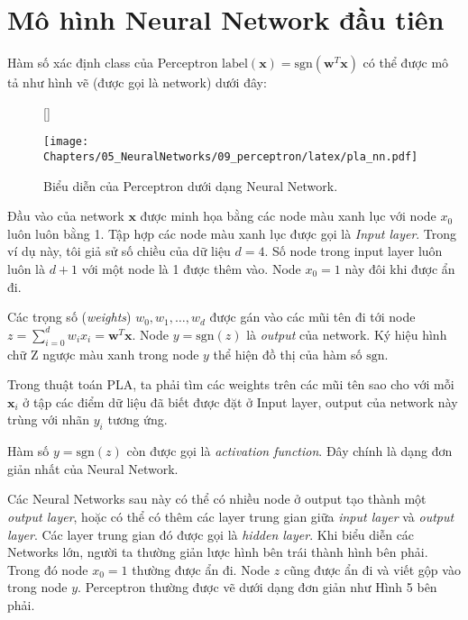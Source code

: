  
\section{Mô hình Neural Network đầu tiên}
Hàm số xác định class của Perceptron $\text{label}(\mathbf{x}) = \text{sgn}(\mathbf{w}^T\mathbf{x})$ có thể được mô tả như hình vẽ (được gọi là network) dưới đây: 
 
\begin{figure}[t]
     [\FBwidth]
     {\caption{ 
     Biểu diễn của Perceptron dưới dạng Neural Network.
     }
     \label{fig:9_5}}
     { %
     \texttt{[image: Chapters/05\_NeuralNetworks/09\_perceptron/latex/pla\_nn.pdf]}
     }
 \end{figure}
  
Đầu vào của network $\mathbf{x}$ được minh họa bằng các node màu xanh lục với node $x_0$ luôn luôn bằng 1. Tập hợp các node màu xanh lục được gọi là \textit{Input layer}. Trong ví dụ này, tôi giả sử số chiều của dữ liệu $d = 4$. Số node trong input layer luôn luôn là $d + 1$ với một node là 1 được thêm vào. Node $x_0 = 1$ này đôi khi được ẩn đi.  
 
Các trọng số (\textit{weights}) $w_0, w_1, \dots, w_d$ được gán vào các mũi tên đi tới node $\displaystyle z = \sum_{i=0}^dw_ix_i = \mathbf{w}^T\mathbf{x}$. Node $y = \text{sgn}(z)$ là \textit{output} của network. Ký hiệu hình chữ Z ngược màu xanh trong node $y$ thể hiện đồ thị của hàm số $\text{sgn}$.  
 
Trong thuật toán PLA, ta phải tìm các weights trên các mũi tên sao cho với mỗi $\mathbf{x}_i$ ở tập các điểm dữ liệu đã biết được đặt ở Input layer, output của network này trùng với nhãn $y_i$ tương ứng.  
 
Hàm số $y = \text{sgn}(z)$ còn được gọi là \textit{activation function}. Đây chính là dạng đơn giản nhất của Neural Network. 
 
 
Các Neural Networks sau này có thể có nhiều node ở output tạo thành một \textit{output layer}, hoặc có thể có thêm các layer trung gian giữa \textit{input layer} và \textit{output layer}. Các layer trung gian đó được gọi là \textit{hidden layer}. Khi biểu diễn các Networks lớn, người ta thường giản lược hình bên trái thành hình bên phải. Trong đó node $x_0 = 1$ thường được ẩn đi. Node $z$ cũng được ẩn đi và viết gộp vào trong node $y$. Perceptron thường được vẽ dưới dạng đơn giản như Hình 5 bên phải.  
 

